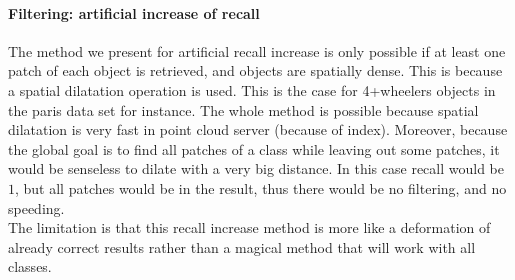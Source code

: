 			\paragraph{Filtering: artificial increase of recall}
				The method we present for artificial recall increase is only possible if at least one patch of each object is retrieved, and objects are spatially dense.
				This is because a spatial dilatation operation is used.
				This is the case for 4+wheelers objects in the paris data set for instance.
				The whole method is possible because spatial dilatation is very fast in point cloud server (because of index).
				Moreover, because the global goal is to find all patches of a class while leaving out some patches, it would be senseless to dilate with a very big distance. In this case recall would be $1$, but all patches would be in the result, thus there would be no filtering, and no speeding.
				\\
				The limitation is that this recall increase method is more like a deformation of already correct results rather than a magical method that will work with all classes.
				
